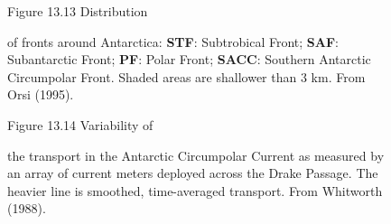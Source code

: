 \begin{figure}[t!] %
{}
\footnotesize
Figure 13.13 Distribution \rule{0mm}{3ex}of fronts around Antarctica:
\textbf{STF}: Subtrobical Front; \textbf{SAF}: Subantarctic Front;
\textbf{PF}: Polar Front; \textbf{SACC}: Southern Antarctic
Circumpolar Front. Shaded areas are shallower than 3 km. From Orsi
(1995).

\label{fig:AACx-section}
\vspace{-3ex}
\end{figure}

\begin{figure}[b!] %
\vspace{-3ex}
\footnotesize
Figure 13.14 Variability of \rule{0mm}{5ex}the transport in the
Antarctic
Circumpolar Current as measured
by an array of current meters deployed across the Drake Passage. The
heavier line is smoothed, time-averaged transport. From Whitworth
(1988).

\label{fig:aacxport}
\end{figure}

